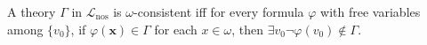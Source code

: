 A theory $\Gamma$ in $\mathcal{L}_{\text{nos}}$ is $\omega$-consistent iff for every formula $\varphi$ with free variables among $\{v_0\}$, if $\varphi(\mathbf{x}) \in \Gamma$ for each $x \in \omega$, then $\exists v_0 \neg \varphi(v_0) \notin \Gamma$.
